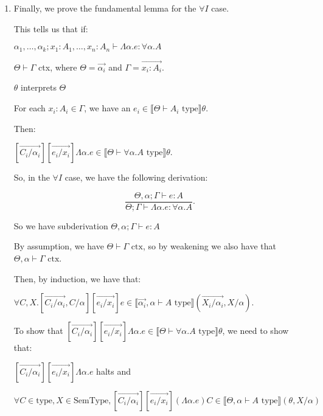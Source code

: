 \begin{enumerate}
  \item

    Finally, we prove the fundamental lemma for the $\forall I$ case.

    This tells us that if:

    $\alpha_1, \ldots, \alpha_k ; x_1 : A_1, \ldots, x_n : A_n \vdash \Lambda \alpha .e : \forall \alpha. A$

    $\Theta \vdash \Gamma$ ctx, where $\Theta = \overrightarrow{\alpha_i}$ and $\Gamma = \overrightarrow{x_i : A_i}$.

    $\theta$ interprets $\Theta$

    For each $x_i : A_i \in \Gamma$, we have an $e_i \in \llbracket \Theta \vdash A_i \text{ type}\rrbracket \theta$.

    Then:

    $[\overrightarrow{C_i / \alpha_i}][\overrightarrow{e_i / x_i}] \Lambda \alpha. e \in \llbracket \Theta \vdash \forall \alpha. A \text{ type}\rrbracket \theta$.

    So, in the $\forall I$ case, we have the following derivation:

    \[
      \frac{\Theta, \alpha; \Gamma \vdash e : A}{\Theta;\Gamma \vdash \Lambda \alpha. e : \forall \alpha. A}
    .\] 

    So we have subderivation $\Theta, \alpha ;\Gamma \vdash e : A$

    By assumption, we have $\Theta \vdash \Gamma \text{ ctx}$, so by weakening we also have that $\Theta ,\alpha \vdash \Gamma \text{ ctx}$.

    Then, by induction, we have that:

    $\forall C, X. [\overrightarrow{C_i / \alpha_i}, C / \alpha][\overrightarrow{e_i / x_i}]e \in \llbracket \overrightarrow{\alpha_i}, \alpha \vdash A \text{ type}\rrbracket (\overrightarrow{X_i / \alpha_i}, X / \alpha)$.

    To show that $[\overrightarrow{C_i / \alpha_i}][\overrightarrow{e_i / x_i}] \Lambda \alpha. e \in \llbracket \Theta \vdash \forall \alpha. A \text{ type}\rrbracket \theta$, we need to show that:

    $[\overrightarrow{C_i / \alpha_i}][\overrightarrow{e_i / x_i}] \Lambda \alpha .e$ halts and

    $\forall C \in \text{type}, X \in \text{SemType}, [\overrightarrow{C_i / \alpha_i}][\overrightarrow{e_i / x_i}](\Lambda \alpha .e) C \in \llbracket \Theta, \alpha \vdash A \text{ type}\rrbracket (\theta, X /\alpha)$


\end{enumerate}

